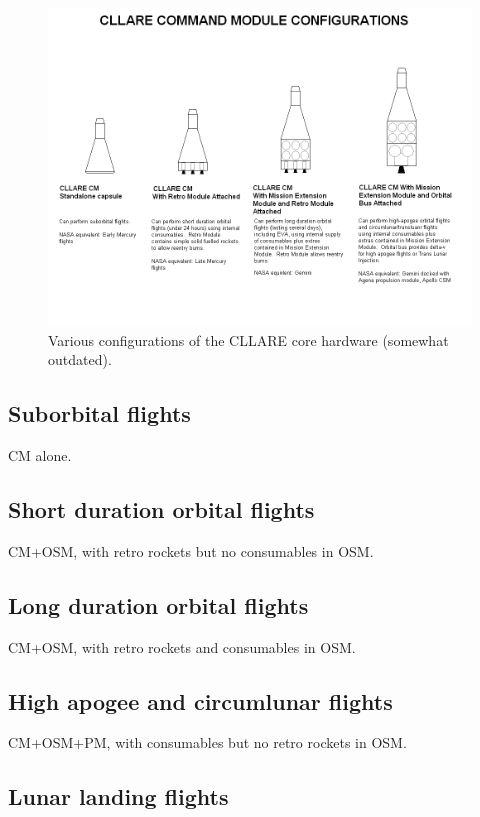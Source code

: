 \documentclass{report}
\begin{document}
\begin{figure}[h] \label{fig:configs}
\includegraphics[angle=270, scale=0.6]{images/cllare_cm_configs}
\caption{Various configurations of the CLLARE core hardware (somewhat outdated).}
\end{figure}

\subsection{Suborbital flights}

CM alone.

\subsection{Short duration orbital flights}

CM+OSM, with retro rockets but no consumables in OSM.

\subsection{Long duration orbital flights}

CM+OSM, with retro rockets and consumables in OSM.

\subsection{High apogee and circumlunar flights}

CM+OSM+PM, with consumables but no retro rockets in OSM.

\subsection{Lunar landing flights}
\end{document}
